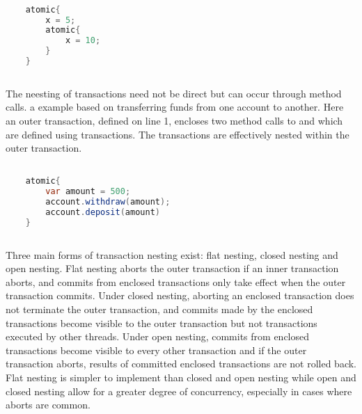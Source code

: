 \begin{lstlisting}[label=lst:stm_nested_transactions,
  caption={Nested transactions},
  language=Java,  
  showspaces=false,
  showtabs=false,
  breaklines=true,
  showstringspaces=false,
  breakatwhitespace=true,
  commentstyle=\color{greencomments},
  keywordstyle=\color{bluekeywords},
  stringstyle=\color{redstrings},
  morekeywords={atomic, retry, orElse, var}]  % Start your code-block

	atomic{
		x = 5;
		atomic{
			x = 10;		
		}
	}
       
\end{lstlisting}
The neesting of transactions need not be direct but can occur through method calls.  a example based on transferring funds from one account to another. Here an outer transaction, defined on line 1, encloses two method calls to  and  which are defined using transactions. The transactions are effectively nested within the outer transaction.
\begin{lstlisting}[label=lst:stm_nested_transactions_real,
  caption={Real world nested transactions},
  language=Java,  
  showspaces=false,
  showtabs=false,
  breaklines=true,
  showstringspaces=false,
  breakatwhitespace=true,
  commentstyle=\color{greencomments},
  keywordstyle=\color{bluekeywords},
  stringstyle=\color{redstrings},
  morekeywords={atomic, retry, orElse, var}]  % Start your code-block

	atomic{
		var amount = 500;
		account.withdraw(amount);
		account.deposit(amount)
	}
       
\end{lstlisting}

Three main forms of transaction nesting exist: flat nesting, closed nesting and open nesting\cite[p. 1]{kumar2011hparstm}\cite[p. 42]{harris2010transactional}. Flat nesting aborts the outer transaction if an inner transaction aborts, and commits from enclosed transactions only take effect when the outer transaction commits. Under closed nesting, aborting an enclosed transaction does not terminate the outer transaction, and commits made by the enclosed transactions become visible to the outer transaction but not transactions executed by other threads. Under open nesting, commits from enclosed transactions become visible to every other transaction and if the outer transaction aborts, results of committed enclosed transactions are not rolled back. Flat nesting is simpler to implement than closed and open nesting while open and closed nesting allow for a greater degree of concurrency, especially in cases where aborts are common\cite[p. 43]{harris2010transactional}.

